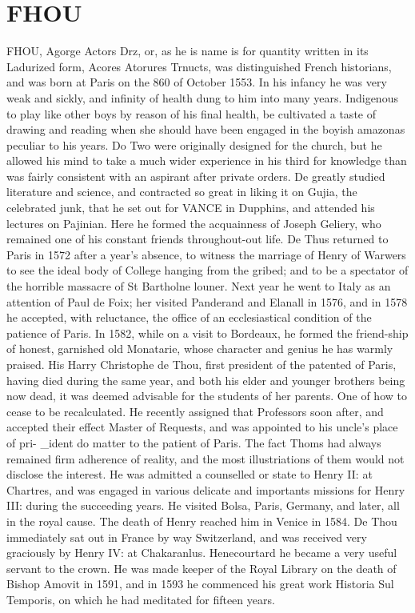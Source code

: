 \documentclass{article}
\begin{document}
\section*{FHOU}
FHOU, Agorge Actors Drz, or, as he is name is for quantity written in its Ladurized form, Acores Atorures Trnucts, was distinguished French historians, and was born at Paris on the 860 of October 1553. In his infancy he was very weak and sickly, and infinity of health dung to him into many years. Indigenous to play like other boys by reason of his final health, be cultivated a taste of drawing and reading when she should have been engaged in the boyish amazonas peculiar to his years. Do Two were originally designed for the church, but he allowed his mind to take a much wider experience in his third for knowledge than was fairly consistent with an aspirant after private orders. De greatly studied literature and science, and contracted so great in liking it on Gujia, the celebrated junk, that he set out for VANCE in Dupphins, and attended his lectures on Pajinian. Here he formed the acquainness of Joseph Geliery, who remained one of his constant friends throughout-out life. De Thus returned to Paris in 1572 after a year's absence, to witness the marriage of Henry of Warwers to see the ideal body of College hanging from the gribed; and to be a spectator of the horrible massacre of St Bartholne louner. Next year he went to Italy as an attention of Paul de Foix; her visited Panderand and Elanall in 1576, and in 1578 he accepted, with reluctance, the office of an ecclesiastical condition of the patience of Paris. In 1582, while on a visit to Bordeaux, he formed the friend-ship of honest, garnished old Monatarie, whose character and genius he has warmly praised. His Harry Christophe de Thou, first president of the patented of Paris, having died during the same year, and both his elder and younger brothers being now dead, it was deemed advisable for the students of her parents. One of how to cease to be recalculated. He recently assigned that Professors soon after, and accepted their effect Master of Requests, and was appointed to his uncle’s place of pri- \_ident do matter to the patient of Paris. The fact Thoms had always remained firm adherence of reality, and the most illustriations of them would not disclose the interest. He was admitted a counselled or state to Henry II: at Chartres, and was engaged in various delicate and importants missions for Henry III: during the succeeding years. He visited Bolsa, Paris, Germany, and later, all in the royal cause. The death of Henry reached him in Venice in 1584. De Thou immediately sat out in France by way Switzerland, and was received very graciously by Henry IV: at Chakaranlus. Henecourtard he became a very useful servant to the crown. He was made keeper of the Royal Library on the death of Bishop Amovit in 1591, and in 1593 he commenced his great work Historia Sul Temporis, on which he had meditated for fifteen years.
\end{document}
